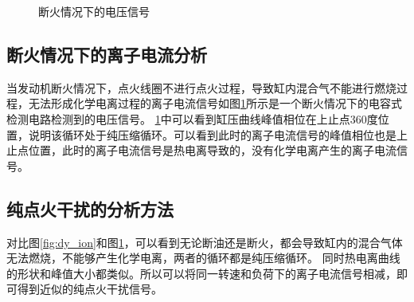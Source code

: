 \begin{figure}[H]
\begin{minipage}[t]{0.5\linewidth}
	\caption{断火情况下的电压信号}
	\label{fig:dh_ion}
\end{minipage}
\end{figure}
\subsection{断火情况下的离子电流分析}   
当发动机断火情况下，点火线圈不进行点火过程，导致缸内混合气不能进行燃烧过程，无法形成化学电离过程的离子电流信号如图\ref{fig:dh_ion}所示是一个断火情况下的电容式检测电路检测到的电压信号。
\ref{fig:dh_ion}中可以看到缸压曲线峰值相位在上止点360度位置，说明该循环处于纯压缩循环。可以看到此时的离子电流信号的峰值相位也是上止点位置，此时的离子电流信号是热电离导致的，没有化学电离产生的离子电流信号。
\subsection{纯点火干扰的分析方法}
对比图\ref{fig:dy_ion}和图\ref{fig:dh_ion}，可以看到无论断油还是断火，都会导致缸内的混合气体无法燃烧，不能够产生化学电离，两者的循环都是纯压缩循环。
同时热电离曲线的形状和峰值大小都类似。所以可以将同一转速和负荷下的离子电流信号相减，即可得到近似的纯点火干扰信号。

